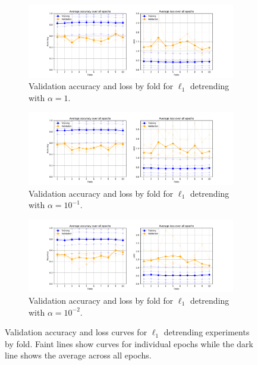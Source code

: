 \begin{figure}[p]
    \centering
    \begin{subfigure}{\textwidth}
        \centering
        \includegraphics[trim={3cm 0 3cm 0.8cm},clip,width=\textwidth]{img/ch5/e0_3_epochs_by_fold.pdf}
        \caption{Validation accuracy and loss by fold for $\ell_1$ detrending with $\alpha = 1$.}
        \label{fig:detrend-acc-loss-e0-fold}
    \end{subfigure}

    \vspace{0.5cm}
    
    \begin{subfigure}{\textwidth}
        \centering
        \includegraphics[trim={3cm 0 3cm 0.8cm},clip,width=\textwidth]{img/ch5/e-1_3_epochs_by_fold.pdf}
        \caption{Validation accuracy and loss by fold for $\ell_1$ detrending with $\alpha = 10^{-1}$.}
        \label{fig:detrend-acc-loss-e-1-fold}
    \end{subfigure}

    \vspace{0.5cm}
    
    \begin{subfigure}{\textwidth}
        \centering
        \includegraphics[trim={3cm 0 3cm 0.8cm},clip,width=\textwidth]{img/ch5/e-2_3_epochs_by_fold.pdf}
        \caption{Validation accuracy and loss by fold for $\ell_1$ detrending with $\alpha = 10^{-2}$.}
        \label{fig:detrend-acc-loss-e-2-fold}
    \end{subfigure}
    \caption{Validation accuracy and loss curves for $\ell_1$ detrending experiments by fold. Faint lines show curves for individual epochs while the dark line shows the average across all epochs.} 
    \label{fig:detrend-acc-loss-curves-fold}
\end{figure}

